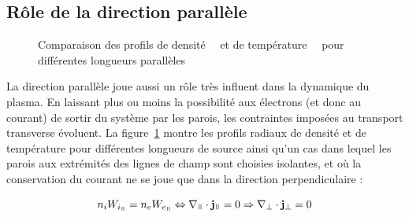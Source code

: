 \begin{refsection}
\subsection{Rôle de la direction parallèle}

\begin{figure}[!htbp]
  \centering
    \caption{Comparaison des profils de
    densité~~ et de
    température~~ pour différentes
    longueurs parallèles}
    \label{4-CybeleProfileDenRadiale}
\end{figure}

La direction parallèle joue aussi un rôle très influent dans la
dynamique du plasma. En laissant plus ou moins la possibilité aux électrons (et
donc au courant) de sortir du système par les parois, les contraintes imposées
au transport transverse évoluent. La figure~\ref{4-CybeleProfileDenRadiale}
montre les profils radiaux de densité et de température pour différentes
longueurs de source ainsi qu'un cas dans lequel les parois aux extrémités des lignes de champ
sont choisies isolantes, et où la conservation du courant ne se joue que dans la
direction perpendiculaire :

\begin{equation}
n_iW_{i_\para}=n_eW_{e_\para}\Leftrightarrow\nabla_\para\cdot\mathbf j_\para = 0
\Rightarrow \nabla_\perp\cdot\mathbf j_\perp = 0
\end{equation}


\end{refsection}
